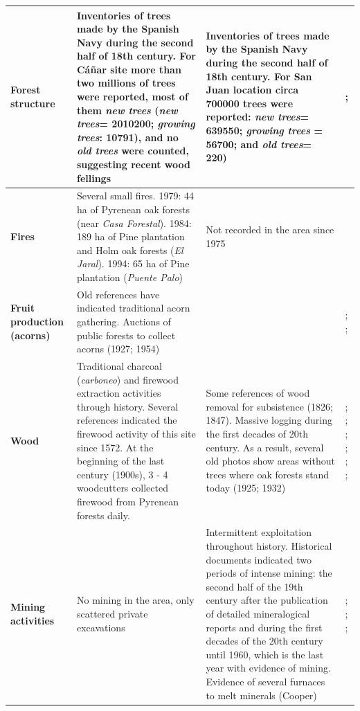 \begin{table}
\begin{tabular}{
>{\centering\arraybackslash}p{}>{\raggedright\arraybackslash}p{}>{\raggedright\arraybackslash}p{}>{\raggedright\arraybackslash}p{}}
\textbf{Forest structure} & Inventories of trees made by the Spanish Navy during the second half of 18th century. For Cáñar site more than two millions of trees were reported, most of them \textit{new trees} (\textit{new trees}= 2010200;  \textit{growing trees}: 10791), and no \textit{old trees} were counted, suggesting recent wood fellings & Inventories of trees made by the Spanish Navy during the second half of 18th century. For San Juan location circa 700000 trees were reported: \textit{new trees}= 639550;  \textit{growing trees} = 56700; and \textit{old trees}= 220) & \textcite{Cruz1991}; \textcite{Wing2015RootsEmpire} \\ \midrule
\textbf{Fires} & Several small fires. 1979: 44 ha of Pyrenean oak forests (near \textit{Casa Forestal}). 1984: 189 ha of Pine plantation and Holm oak forests (\textit{El Jaral}). 1994: 65 ha of Pine plantation (\textit{Puente Palo}) & Not recorded in the area since 1975 & \textcite{Bonet2014conama, MorenoLlorca2016,CMA2018} \\ \midrule
\textbf{Fruit production (acorns)} & Old references have indicated traditional acorn gathering. Auctions of public forests to collect acorns (1927; 1954) &  & \textcite{Bonet2014conama}; \textcite{Catastro1752}; \textcite{MesaTorres2009} \\ \midrule
\textbf{Wood} & Traditional charcoal (\textit{carboneo}) and firewood extraction activities through history. Several references indicated the firewood activity of this site since 1572. At the beginning of the last century (1900s), 3 - 4 woodcutters collected firewood from Pyrenean forests daily. & Some references of wood removal for subsistence (1826; 1847). Massive logging during the first decades of 20th century. As a result, several old photos show areas without trees where oak forests stand today (1925; 1932) & \textcite{Bonet2014conama}; \textcite{Catastro1752}; \textcite{Ferrer1999}; \textcite{Lopez1776}; \textcite{MesaTorres2009}; \textcite{Madoz1846}; \textcite{Titos1997} \\ \midrule
\textbf{Mining activities} & No mining in the area, only scattered private excavations & Intermittent exploitation throughout history. Historical documents indicated two periods of intense mining: the second half of the 19th century after the publication of detailed mineralogical reports and during the first decades of the 20th century until 1960, which is the last year with evidence of mining. Evidence of several furnaces to melt minerals (Cooper) & \textcite{Maestre1852} ; \textcite{Maestre1858}; \textcite{MesaTorres2009}; \textcite{Titos1990} \\ \midrule

\end{tabular}
\end{table}
